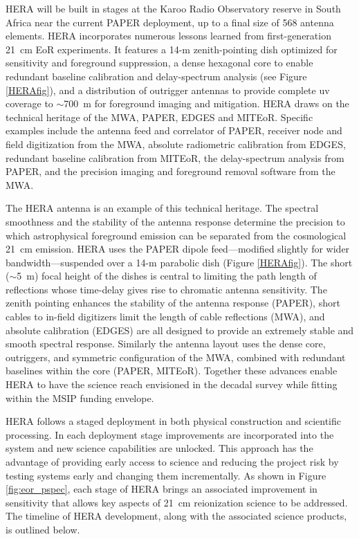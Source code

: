 \documentclass[preprint]{aastex}
\begin{document}
HERA will be built in stages at the Karoo Radio Observatory reserve in South Africa near the
current PAPER deployment, up to a final size of 568 antenna elements.
HERA 
incorporates numerous lessons learned from first-generation 21~cm EoR experiments.
It features a 14-m zenith-pointing dish optimized for sensitivity and foreground suppression,
a dense hexagonal core to enable redundant baseline calibration and
delay-spectrum analysis (see Figure \ref{HERAfig}), and a distribution of outrigger antennas to provide
complete uv coverage to $\sim$700~m for foreground imaging and mitigation.
HERA draws on the technical heritage of the MWA, PAPER,
EDGES and MITEoR. Specific examples include the antenna feed and correlator of
PAPER, receiver node and field digitization from the MWA, absolute radiometric
calibration from EDGES, redundant baseline calibration from MITEoR, the
delay-spectrum analysis from PAPER, and the precision imaging and foreground
removal software from the MWA.


The HERA antenna is an example of this technical heritage. The spectral
smoothness and the stability of the antenna response determine the precision to
which astrophysical foreground emission can be separated from the cosmological
21~cm emission. HERA uses the PAPER dipole feed---modified slightly for wider
bandwidth---suspended over a 14-m parabolic dish (Figure \ref{HERAfig}). The
short ($\sim$5~m) focal height of the dishes is central to limiting the path
length of reflections whose time-delay gives rise to chromatic antenna
sensitivity. The zenith pointing enhances the stability of the antenna response
(PAPER), short cables to in-field digitizers limit the length of cable
reflections (MWA), and absolute calibration (EDGES) are all designed to provide
an extremely stable and smooth spectral response. Similarly the antenna layout
uses the dense core, outriggers, and symmetric configuration of the MWA,
combined with redundant baselines within the core (PAPER, MITEoR). Together
these advances enable HERA to have the science reach envisioned in the decadal
survey while fitting within the MSIP funding envelope.

HERA follows a staged deployment in both physical construction and scientific processing.  In
each deployment stage improvements are incorporated into the system and new
science capabilities are unlocked.  This approach has the advantage of
providing early access to science and reducing the project risk by testing systems
early and changing them incrementally.  As shown in Figure \ref{fig:eor_pspec}, each
stage of HERA brings an associated improvement in sensitivity that allows key
aspects of 21~cm reionization science to be addressed.  The timeline of HERA
development, along with the associated science products, is outlined below. 
\end{document}
